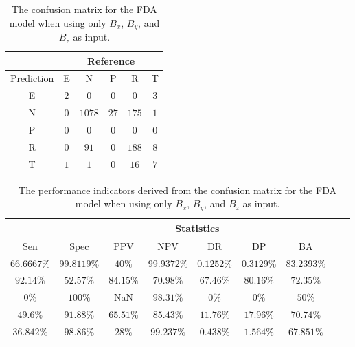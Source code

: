 \begin{table}[!ht]
	\centering
	\begin{tabular}{|c|c|c|c|c|c|}
		\hline
		 & \multicolumn{5}{|c|}{Reference} \\ \hline
		 Prediction & E & N & P & R & T \\ \hline
		 E & $2$ & $0$ & $0$ & $0$ & $3$ \\ \hline
		 N & $0$ & $1078$ & $27$ & $175$ & $1$ \\ \hline
		 P & $0$ & $0$ & $0$ & $0$ & $0$ \\ \hline
		 R & $0$ & $91$ & $0$ & $188$ & $8$ \\ \hline
		 T & $1$ & $1$ & $0$ & $16$ & $7$ \\ \hline
	\end{tabular}
	\caption{The confusion matrix for the FDA model when using only $B_{x}$, $B_{y}$, and $B_{z}$ as input.}
	\label{tab:cm:coord:fda}
\end{table}

\begin{table}[!ht]
	\centering
	\begin{tabular}{|c|c|c|c|c|c|c|c|c|}
		\hline
		 & \multicolumn{7}{c|}{Statistics} \\ \hline
		Sen & Spec & PPV & NPV & DR & DP & BA \\ \hline
		$66.6667\%$ & $99.8119\%$ & $40\%$ & $99.9372\%$ & $0.1252\%$ & $0.3129\%$ & $83.2393\%$ \\ \hline
		$92.14\%$ & $52.57\%$ & $84.15\%$ & $70.98\%$ & $67.46\%$ & $80.16\%$ & $72.35\%$ \\ \hline
		$0\%$ & $100\%$ & NaN & $98.31\%$ & $0\%$ & $0\%$ & $50\%$ \\ \hline
		$49.6\%$ & $91.88\%$ & $65.51\%$ & $85.43\%$ & $11.76\%$ & $17.96\%$ & $70.74\%$ \\ \hline
		$36.842\%$ & $98.86\%$ & $28\%$ & $99.237\%$ & $0.438\%$ & $1.564\%$ & $67.851\%$ \\ \hline
	\end{tabular}
	\caption{The performance indicators derived from the confusion matrix for the FDA model when using only $B_{x}$, $B_{y}$, and $B_{z}$ as input.}
	\label{tab:cs:coord:fda}
\end{table}

